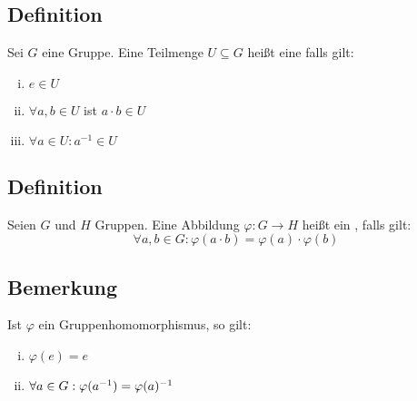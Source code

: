 \subsection[Definition: Untergruppe]{Definition} %
\label{sub:18}
Sei $G$ eine Gruppe. Eine Teilmenge $U \subseteq G$ heißt eine  falls gilt:
\begin{multicols}{3}
	\begin{enumerate}[(i)]
		\item $e \in U$
		\item $\forall a,b \in U$ ist $a \cdot b \in U$
		\item $\forall a \in U : a ^{-1} \in U$
	\end{enumerate}
\end{multicols}

\subsection[Definition: Gruppenhomomorphismus]{Definition} %
\label{sub:19}
Seien $G$ und $H$ Gruppen. Eine Abbildung $\varphi : G \to H$ heißt ein , falls gilt:
\[
	\forall a,b \in G : \varphi(a \cdot b) = \varphi(a) \cdot \varphi(b)
\] 

\subsection[Bemerkung: Eigenschaften von Gruppenhomomorphismen]{Bemerkung} %
\label{sub:110}
Ist $\varphi$ ein Gruppenhomomorphismus, so gilt: 
\begin{multicols}{2}
	\begin{enumerate}[(i)]
		\item $\varphi(e) =e$
		\item $\forall a \in G : \varphi ( a ^{-1}) = \varphi(a) ^{-1} $
	\end{enumerate}
\end{multicols}

